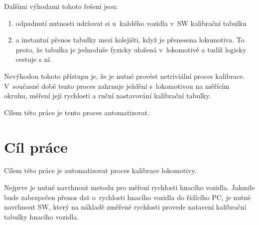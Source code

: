 Dalšími výhodami tohoto řešení jsou:

\begin{enumerate}
	\item odpadnutí nutnosti udržovat si u~každého vozidla v~SW kalibrační
	tabulku
	\item a instantní přenos tabulky mezi kolejišti, když je přenesena
	lokomotiva. To proto, že tabulka je jednoduše fyzicky uložená v~lokomotivě a
	tudíž logicky cestuje s ní.
\end{enumerate}

Nevýhodou tohoto přístupu je, že je nutné provést netriviální proces kalibrace.
V~současné době tento proces zahrnuje ježdění s~lokomotivou na měřícím okruhu,
měření její rychlosti a ruční nastavování kalibrační tabulky.

Cílem této práce je tento proces automatizovat.

\section{Cíl práce}

Cílem této práce je automatizovat proces kalibrace lokomotivy.

Nejprve je nutné navrhnout metodu pro měření rychlosti hnacího vozidla. Jakmile
bude zabezpečen přenos dat o~rychlosti hnacího vozidla do řídícího PC, je nutné
navrhnout SW, který na nákladě změřené rychlosti provede natavení kalibrační
tabulky hnacího vozidla.
